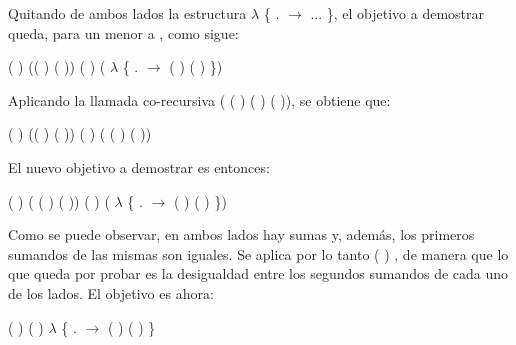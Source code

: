 \begin{AgdaAlign}
Quitando de ambos lados la estructura  $\lambda$ \{ . $\rightarrow$ ... \}, el objetivo a demostrar queda, para un  menor a , como sigue:
\begin{center}
\AgdaFunction{[}  \AgdaFunction{]}  ( ) (( ) \AgdaFunction{+} ( )) \AgdaFunction{$\leq$} ( ) \AgdaFunction{+} ( $\lambda$ \{ . $\rightarrow$  ( ) ( ) \})
\end{center}

Aplicando la llamada co-recursiva (  ( ) ( ) ( )), se obtiene que:
\begin{center}
\AgdaFunction{[}  \AgdaFunction{]}  ( ) (( ) \AgdaFunction{+} ( )) \AgdaFunction{$\leq$} ( ) \AgdaFunction{+} ( ( ) ( ))
\end{center}

El nuevo objetivo a demostrar es entonces:
\begin{center}
\AgdaFunction{[}  \AgdaFunction{]} ( ) \AgdaFunction{+} ( ( ) ( )) \AgdaFunction{$\leq$} ( ) \AgdaFunction{+} ( $\lambda$ \{ . $\rightarrow$  ( ) ( ) \})
\end{center}

Como se puede observar, en ambos lados hay sumas y, además, los primeros sumandos de las mismas son iguales. Se aplica por lo tanto  ( ) , de manera que lo que queda por probar es la desigualdad entre los segundos sumandos de cada uno de los lados. El objetivo es ahora:
\begin{center}
\AgdaFunction{[}  \AgdaFunction{]}  ( ) ( ) \AgdaFunction{$\leq$}  $\lambda$ \{ . $\rightarrow$  ( ) ( ) \}
\end{center}


\end{AgdaAlign}
